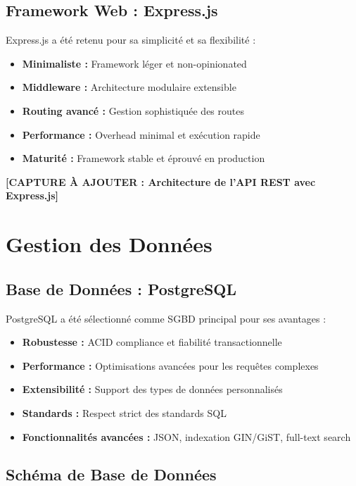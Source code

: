 \subsection{Framework Web : Express.js}

Express.js a été retenu pour sa simplicité et sa flexibilité :

\begin{itemize}
    \item \textbf{Minimaliste :} Framework léger et non-opinionated
    \item \textbf{Middleware :} Architecture modulaire extensible
    \item \textbf{Routing avancé :} Gestion sophistiquée des routes
    \item \textbf{Performance :} Overhead minimal et exécution rapide
    \item \textbf{Maturité :} Framework stable et éprouvé en production
\end{itemize}

\textbf{[CAPTURE À AJOUTER : Architecture de l'API REST avec Express.js]}

\section{Gestion des Données}

\subsection{Base de Données : PostgreSQL}

PostgreSQL a été sélectionné comme SGBD principal pour ses avantages :

\begin{itemize}
    \item \textbf{Robustesse :} ACID compliance et fiabilité transactionnelle
    \item \textbf{Performance :} Optimisations avancées pour les requêtes complexes
    \item \textbf{Extensibilité :} Support des types de données personnalisés
    \item \textbf{Standards :} Respect strict des standards SQL
    \item \textbf{Fonctionnalités avancées :} JSON, indexation GIN/GiST, full-text search
\end{itemize}

\subsection{Schéma de Base de Données}

